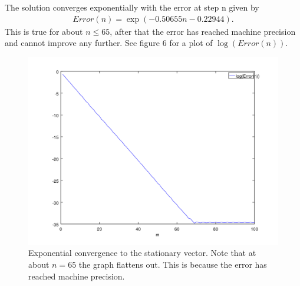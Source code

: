 \documentclass{unswmaths}
\begin{document}
The solution converges exponentially with the error at step n given by
\begin{align*}
    Error(n) = \exp(-0.50655n - 0.22944).
\end{align*}
This is true for about $ n \leq 65 $, after that the error has reached machine precision and cannot improve any further.
See figure 6 for a plot of $ \log(Error(n)) $.
\begin{figure}[h]
    \includegraphics[scale=0.5]{Log_Error_n}
    \caption{Exponential convergence to the stationary vector. Note that at about $n = 65 $ the graph flattens out. This is because the error has reached machine precision.}
\end{figure}
\end{document}
